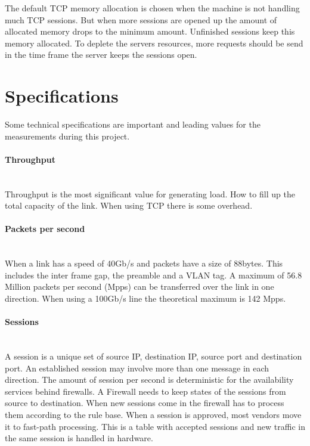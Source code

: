 The default TCP memory allocation is chosen when the machine is not handling much TCP sessions. But when more sessions are opened up the amount of allocated memory drops to the minimum amount. 
Unfinished sessions keep this memory allocated. To deplete the servers resources, more requests should be send in the time frame the server keeps the sessions open.

\section{Specifications}\label{sec:specifications}
Some technical specifications are important and leading values for the measurements during this project. 

\paragraph{Throughput}\mbox{}\\
Throughput is the most significant value for generating load. How to fill up the total capacity of the link. When using TCP there is some overhead.

\paragraph{Packets per second}\label{par:requnused}\mbox{}\\
When a link has a speed of 40Gb/s and packets have a size of 88bytes. This includes the inter frame gap, the preamble and a VLAN tag. A maximum of 56.8 Million packets per second (Mpps) can be transferred over the link in one direction. When using a 100Gb/s line the theoretical maximum is 142 Mpps.   

\paragraph{Sessions}\label{par:legitmoas}\mbox{}\\
A session is a unique set of source IP, destination IP, source port and destination port. An established session may involve more than one message in each direction.
The amount of session per second is deterministic for the availability services behind firewalls. A Firewall needs to keep states of the sessions from source to destination. 
When new sessions come in the firewall has to process them according to the rule base. When a session is approved, most vendors move it to fast-path processing. This is a table with accepted sessions and new traffic in the same session is handled in hardware.

